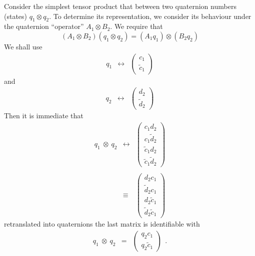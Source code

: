 \vspace*{11mm}


Consider the simplest tensor product that between two quaternion numbers
(states) $q_{1} \otimes q_{2}$. To determine its representation, we
consider its behaviour under the quaternion ``operator''
$A_{1} \otimes B_{2}$. We require that
\begin{equation}
(A_{1} \otimes B_{2})(q_{1} \otimes q_{2}) = (A_{1}q_{1}) \otimes (B_{2}q_{2})
\end{equation}
We shall use
\begin{eqnarray*}
q_{1} & \leftrightarrow & \left( \begin{array}{c} c_{1}\\
\tilde{c}_{1} \end{array} \right)
\end{eqnarray*}
and
\begin{eqnarray*}
q_{2} & \leftrightarrow & \left( \begin{array}{c} d_{2}\\
\tilde{d}_{2} \end{array} \right)
\end{eqnarray*}
Then it is immediate that
\begin{eqnarray}
q_{1} \: \otimes \: q_{2} & \leftrightarrow & \left( \begin{array}{c}
c_{1}d_{2}\\
c_{1}\tilde{d}_{2}\\ \tilde{c}_{1}d_{2}\\
\tilde{c}_{1}\tilde{d}_{2} \end{array} \right)  \nonumber \\ \\
 & \equiv & \left( \begin{array}{c} d_{2}c_{1}\\
\tilde{d}_{2}c_{1}\\ d_{2}\tilde{c}_{1} \\
\tilde{d}_{2}\tilde{c}_{1} \end{array} \right)
\end{eqnarray}
retranslated into quaternions the last matrix is identifiable with
\begin{eqnarray} \label{l}
q_{1} \: \otimes \: q_{2} & = & \left( \begin{array}{c} q_{2}c_{1}\\
q_{2}\tilde{c}_{1} \end{array} \right) \: \: .
\end{eqnarray}
